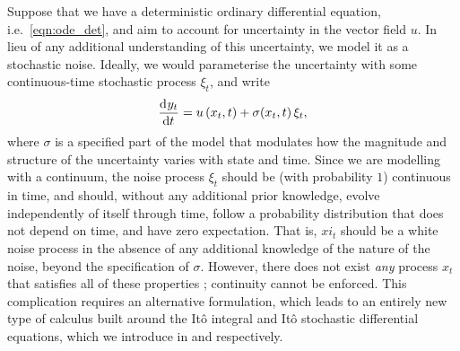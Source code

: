 Suppose that we have a deterministic ordinary differential equation, i.e.\ \cref{eqn:ode_det}, and aim to account for uncertainty in the vector field \(u\).
In lieu of any additional understanding of this uncertainty, we model it as a stochastic noise.
Ideally, we would parameterise the uncertainty with some continuous-time stochastic process \(\xi_t\), and write
\begin{equation}\label{eqn:fake_sde}
	\dod{y_t}{t} = u\left(x_t, t\right) + \sigma\!\left(x_t, t\right)\xi_t,
\end{equation}
where \(\sigma\) is a specified part of the model that modulates how the magnitude and structure of the uncertainty varies with state and time.
Since we are modelling with a continuum, the noise process \(\xi_t\) should be (with probability \(1\)) continuous in time, and should, without any additional prior knowledge, evolve independently of itself through time, follow a probability distribution that does not depend on time, and have zero expectation.
That is, \(xi_t\) should be a white noise process in the absence of any additional knowledge of the nature of the noise, beyond the specification of \(\sigma\).
However, there does not exist \emph{any} process \(x_t\) that satisfies all of these properties \citep{Oksendal_2003_StochasticDifferentialEquations}; continuity cannot be enforced.
This complication requires an alternative formulation, which leads to an entirely new type of calculus built around the It\^o integral and It\^o stochastic differential equations, which we introduce in  and  respectively.


